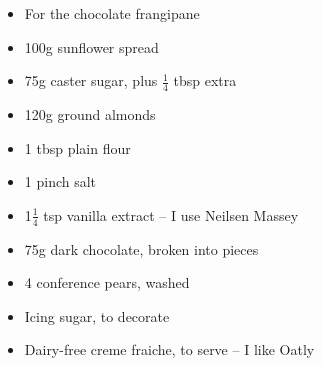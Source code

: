 \documentclass{book}
\begin{document}
\begin{itemize}
\item For the chocolate frangipane
\item 100g sunflower spread
\item 75g caster sugar, plus $\frac{1}{4}$ tbsp extra
\item 120g ground almonds
\item 1 tbsp plain flour
\item 1 pinch salt
\item 1$\frac{1}{4}$ tsp vanilla extract – I use Neilsen Massey
\item 75g dark chocolate, broken into pieces
\item 4 conference pears, washed
\item Icing sugar, to decorate
\item Dairy-free creme fraiche, to serve – I like Oatly
\end{itemize}
\end{document}

